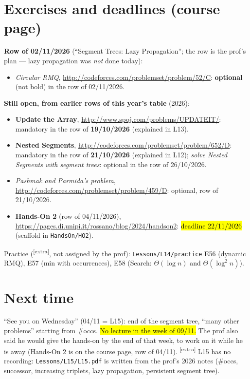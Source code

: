 \documentclass[11pt,a4paper]{article}
\theoremstyle{definition}\newtheorem*{definition}{Definition}
\newcommand{\hlp}[1]{{\sethlcolor{hlP}\hl{#1}}}
\newcommand{\extra}{\textsuperscript{\textcolor{warn}{[extra]}}}
\begin{document}
\section{Exercises and deadlines (course page)}\label{sec:ex}
\begin{keybox}
\textbf{Row of 02/11/2026} (``Segment Trees: Lazy Propagation''; the row is the prof's plan --- lazy propagation was \emph{not} done today):
\begin{itemize}[nosep]
\item \emph{Circular RMQ}, \url{http://codeforces.com/problemset/problem/52/C}: \textbf{optional} (not bold) in the row of 02/11/2026.
\end{itemize}
\smallskip
\textbf{Still open, from earlier rows of this year's table} (2026):
\begin{itemize}[nosep]
\item \textbf{Update the Array}, \url{http://www.spoj.com/problems/UPDATEIT/}: mandatory in the row of \textbf{19/10/2026} (explained in L13).
\item \textbf{Nested Segments}, \url{http://codeforces.com/problemset/problem/652/D}: mandatory in the row of \textbf{21/10/2026} (explained in L12);
      \emph{solve Nested Segments with segment trees}: optional in the row of 26/10/2026.
\item \emph{Pashmak and Parmida's problem}, \url{http://codeforces.com/problemset/problem/459/D}: optional, row of 21/10/2026.
\item \textbf{Hands-On 2} (row of 04/11/2026), \url{https://pages.di.unipi.it/rossano/blog/2024/handson2}: \hlp{deadline 22/11/2026} (scaffold in \texttt{HandsOn/HO2}).
\end{itemize}
\end{keybox}
\noindent Practice (\extra, not assigned by the prof): \texttt{Lessons/L14/practice} E56 (dynamic RMQ), E57 (min with occurrences), E58 (\textsf{Search}: $\Theta(\log n)$ and $\Theta(\log^2 n)$).

\section{Next time}
``See you on Wednesday'' (04/11 = L15): end of the segment tree, ``many other problems'' starting from \#occs. \hlp{No lecture in the week of 09/11.}
The prof also said he would give the hands-on by the end of that week, to work on it while he is away (Hands-On 2 is on the course page, row of 04/11).
\extra{} L15 has no recording: \texttt{Lessons/L15/L15.pdf} is written from the prof's 2026 notes (\#occs, successor, increasing triplets, lazy propagation, persistent segment tree).
\end{document}
